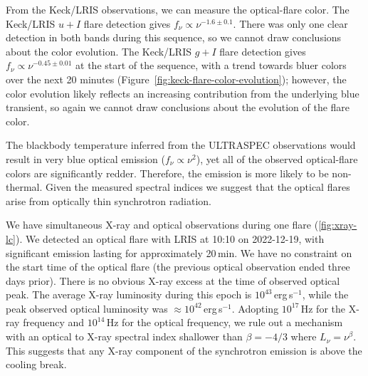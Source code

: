 \documentclass{nature_plusfigure}
\begin{document}
\begin{methods}
From the Keck/LRIS observations, we can measure the optical-flare color. The Keck/LRIS $u+I$ flare detection gives $f_\nu \propto \nu^{-1.6\pm0.1}$. There was only one clear detection in both bands during this sequence, so we cannot draw conclusions about the color evolution. The Keck/LRIS $g+I$ flare detection gives $f_\nu \propto \nu^{-0.45\pm0.01}$ at the start of the sequence, with a trend towards bluer colors over the next 20 minutes (Figure~\ref{fig:keck-flare-color-evolution}); however, the color evolution likely reflects an increasing contribution from the underlying blue transient, so again we cannot draw conclusions about the evolution of the flare color.

The blackbody temperature inferred from the ULTRASPEC observations would result in very blue optical emission ($f_\nu\propto\nu^2$), yet all of the observed optical-flare colors are significantly redder. Therefore, the emission is more likely to be non-thermal. Given the measured spectral indices we suggest that the optical flares arise from optically thin synchrotron radiation. 

We have simultaneous X-ray and optical observations during one flare (\ref{fig:xray-lc}). We detected an optical flare with LRIS at 10:10 on 2022-12-19, with significant emission lasting for approximately 20\,min. We have no constraint on the start time of the optical flare (the previous optical observation ended three days prior). There is no obvious X-ray excess at the time of observed optical peak. The average X-ray luminosity during this epoch is $10^{43}\,$erg\,s$^{-1}$, while the peak observed optical luminosity was $\approx 10^{42}$\,erg\,s$^{-1}$.
Adopting $10^{17}\,$Hz for the X-ray frequency and $10^{14}\,$Hz for the optical frequency, we rule out a mechanism with an optical to X-ray spectral index shallower than $\beta=-4/3$ where $L_\nu = \nu^{\beta}$. This suggests that any X-ray component of the synchrotron emission is above the cooling break.




\end{methods}
\end{document}
